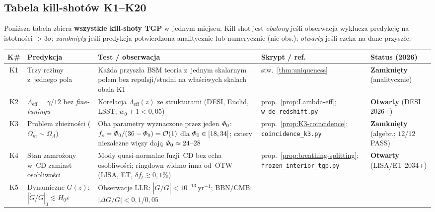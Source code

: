 \subsection{Tabela kill-shot\'ow K1--K20}\label{ssec:killshots}

Poni\.zsza tabela zbiera \textbf{wszystkie kill-shoty TGP} w~jednym miejscu.
Kill-shot jest \emph{obalony} je\'sli obserwacja wyklucza predykcj\k{e} na
istotno\'sci $>3\sigma$; \emph{zamkni\k{e}ty} je\'sli predykcja potwierdzona
analitycznie lub numerycznie (nie obs.); \emph{otwarty} je\'sli czeka na
dane przysz\l{}e.

\begin{center}
\small
\setlength{\tabcolsep}{4pt}
\begin{tabular}{@{}c>{\raggedright}p{3.1cm}p{4.4cm}p{2.0cm}p{2.0cm}@{}}
\toprule
\textbf{K\#} & \textbf{Predykcja} & \textbf{Test / obserwacja}
  & \textbf{Skrypt / ref.} & \textbf{Status (2026)} \\
\midrule
K1 & Trzy re\.zimy z~jednego pola
   & Ka\.zda przysz\l{}a BSM teoria z~jednym skalarnym polem
     bez repulsji/studni na w\l{}a\'sciwych skalach obala K1
   & stw.~\ref{thm:uniqueness}
   & \textbf{Zamkni\k{e}ty} (analitycznie) \\[3pt]
K2 & $\Lambda_{\mathrm{eff}} = \gamma/12$ bez \emph{fine-tuningu}
   & Korelacja $\Lambda_{\mathrm{eff}}(z)$ ze strukturami
     (DESI, Euclid, LSST; $w_0 + 1 < 0{,}05$)
   & prop.~\ref{prop:Lambda-eff}; \texttt{w\_de\_redshift.py}
   & \textbf{Otwarty} (DESI 2026+) \\[3pt]
K3 & Problem zbie\.zno\'sci ($\Omega_m \sim \Omega_\Lambda$)
   & Oba parametry wyznaczone przez jeden $\varPhi_0$:
     $f_c = \varPhi_0/(36-\varPhi_0) = \mathcal{O}(1)$
     dla $\varPhi_0 \in [18, 34]$; cztery niezale\.zne
     wi\k{e}zy daj\k{a} $\varPhi_0 \approx 24$--$28$
   & prop.~\ref{prop:K3-coincidence};
     \texttt{coincidence\_k3.py}
   & \textbf{Zamkni\k{e}ty} (algebr.; $12/12$ PASS) \\[3pt]
K4 & Stan zamro\.zony w~CD zamiast osobliwo\'sci
   & Mody quasi-normalne fuzji~CD bez echa osobliwo\'sci;
     ringdown widmo inna od~OTW (LISA, ET, $\delta f_l \gtrsim 0{,}1\%$)
   & prop.~\ref{prop:breathing-splitting}; \texttt{frozen\_interior\_tgp.py}
   & \textbf{Otwarty} (LISA/ET 2034+) \\[3pt]
K5 & Dynamiczne $G(z)$: $|\dot G/G|_0 \lesssim H_0\varepsilon$
   & Obserwacje LLR: $|\dot G/G| < 10^{-13}\ \mathrm{yr}^{-1}$;
     BBN/CMB: $|\Delta G/G| < 0{,}1$/$0{,}05$

\end{tabular}
\end{center}
